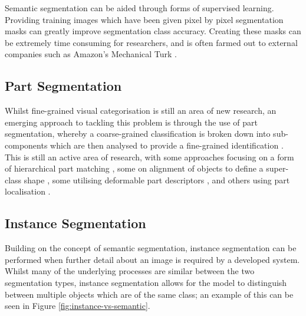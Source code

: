 Semantic segmentation can be aided through forms of supervised learning. Providing training images which have been given pixel by pixel segmentation masks can greatly improve segmentation class accuracy. Creating these masks can be extremely time consuming for researchers, and is often farmed out to external companies such as Amazon's Mechanical Turk \cite{buhrmester_amazons_2011}.

\subsection{Part Segmentation}\label{ch:Background,sec:Fine-grainedCV,sub:PartSegmentation}
Whilst fine-grained visual categorisation is still an area of new research, an emerging approach to tackling this problem is through the use of part segmentation, whereby a coarse-grained classification is broken down into sub-components which are then analysed to provide a fine-grained identification \cite{zhang_part-based_2014}. This is still an active area of research, with some approaches focusing on a form of hierarchical part matching \cite{xie_hierarchical_2013}, some on alignment of objects to define a super-class shape \cite{gavves_fine-grained_2013}, some utilising deformable part descriptors \cite{zhang_deformable_2013}, and others using part localisation \cite{liu_dog_2012}.


\subsection{Instance Segmentation}\label{ch:Background,sec:instanceSegmentation}

Building on the concept of semantic segmentation, instance segmentation can be performed when further detail about an image is required by a developed system. Whilst many of the underlying processes are similar between the two segmentation types, instance segmentation allows for the model to distinguish between multiple objects which are of the same class;  an example of this can be seen in Figure \ref{fig:instance-vs-semantic}. 

